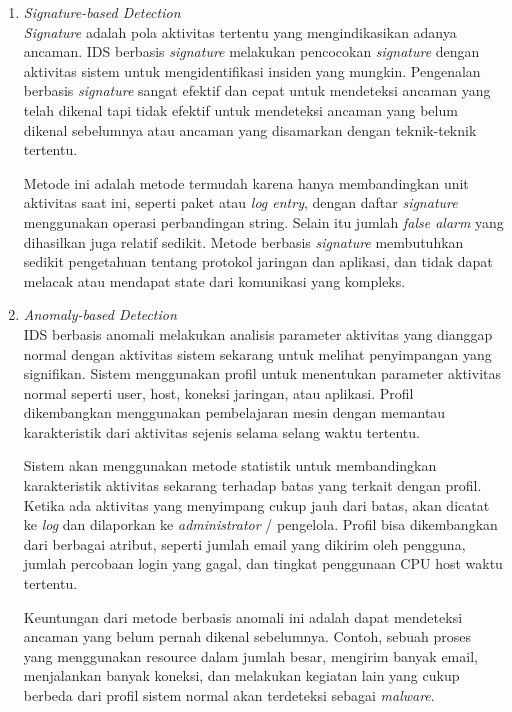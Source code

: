     \begin{enumerate}

      \item
      \emph{Signature-based Detection} \\
      \emph{Signature} adalah pola aktivitas tertentu yang mengindikasikan adanya ancaman. IDS berbasis \emph{signature} melakukan pencocokan \emph{signature} dengan aktivitas sistem untuk mengidentifikasi insiden yang mungkin. Pengenalan berbasis \emph{signature} sangat efektif dan cepat untuk mendeteksi ancaman yang telah dikenal tapi tidak efektif untuk mendeteksi ancaman yang belum dikenal sebelumnya atau ancaman yang disamarkan dengan teknik-teknik tertentu.

      Metode ini adalah metode termudah karena hanya membandingkan unit aktivitas saat ini, seperti paket atau \emph{log entry}, dengan daftar \emph{signature} menggunakan operasi perbandingan string. Selain itu jumlah \emph{false alarm} yang dihasilkan juga relatif sedikit. Metode berbasis \emph{signature} membutuhkan sedikit pengetahuan tentang protokol jaringan dan aplikasi, dan tidak dapat melacak atau mendapat state dari komunikasi yang kompleks.

      \item
      \emph{Anomaly-based Detection} \\
      IDS berbasis anomali melakukan analisis parameter aktivitas yang dianggap normal dengan aktivitas sistem sekarang untuk melihat penyimpangan yang signifikan. Sistem menggunakan profil untuk menentukan parameter aktivitas normal seperti user, host, koneksi jaringan, atau aplikasi. Profil dikembangkan menggunakan pembelajaran mesin dengan memantau karakteristik dari aktivitas sejenis selama selang waktu tertentu.

      Sistem akan menggunakan metode statistik untuk membandingkan karakteristik aktivitas sekarang terhadap batas yang terkait dengan profil. Ketika ada aktivitas yang menyimpang cukup jauh dari batas, akan dicatat ke \emph{log} dan dilaporkan ke \emph{administrator} / pengelola. Profil bisa dikembangkan dari berbagai atribut, seperti jumlah email yang dikirim oleh pengguna, jumlah percobaan login yang gagal, dan tingkat penggunaan CPU host waktu tertentu.

      Keuntungan dari metode berbasis anomali ini adalah dapat mendeteksi ancaman yang belum pernah dikenal sebelumnya. Contoh, sebuah proses yang menggunakan resource dalam jumlah besar, mengirim banyak email, menjalankan banyak koneksi, dan melakukan kegiatan lain yang cukup berbeda dari profil sistem normal akan terdeteksi sebagai \emph{malware}.


\end{enumerate}
